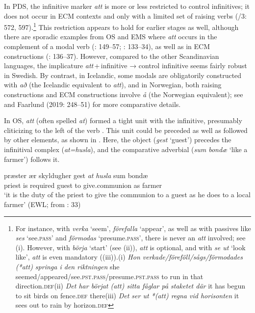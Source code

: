 \documentclass[output=paper]{langscibook}
\begin{document}
In PDS, the infinitive marker \textit{att} is more or less restricted to control infinitives; it does not occur in ECM contexts and only with a limited set of raising verbs (\citealt{TelemanEtAl1999}/3: 572, 597).\footnote{For instance, with \textit{verka} ‘seem’, \textit{förefalla} ‘appear’, as well as with passives like \textit{ses} ‘see.\textsc{pass}’ and \textit{förmodas} ‘presume.\textsc{pass}’, there is never an \textit{att} involved; see (i). However, with \textit{börja} ‘start’ (see (ii)), \textit{att} is optional, and with \textit{se ut} ‘look like’, \textit{att} is even mandatory ((iii)).(i)  \textit{Hon   verkade/föreföll/sågs/förmodades     (*att)   springa   i    den   riktningen}  she   seemed/appeared/see\textsc{.pst.pass}/presume\textsc{.pst.pass} to     run     in   that   direction\textsc{.def}(ii)  \textit{Det   har börjat (att)   sitta   fåglar   på staketet     där}  it   has begun to   sit     birds   on fence\textsc{.def}   there(iii)  \textit{Det   ser     ut   *(att)   regna   vid   horisonten}  it   sees     out to     rain     by   horizon.\textsc{def}} This restriction appears to hold for earlier stages as well, although there are sporadic examples from OS and EMS where \textit{att} occurs in the complement of a modal verb (\citealt{Lagervall2014}: 149–57; \citealt{Kalm2016Satsekvivalenta}: 133–34), as well as in ECM constructions (\citealt{Kalm2016Satsekvivalenta}: 136–37). However, compared to the other Scandinavian languages, the implicature \textit{att}\,+\,infinitive → control infinitive seems fairly robust in Swedish. By contrast, in Icelandic, some modals are obligatorily constructed with \textit{að} (the Icelandic equivalent to \textit{att}), and in Norwegian, both raising constructions and ECM constructions involve \textit{å} (the Norwegian equivalent); see \citet[45]{Kalm2016Satsekvivalenta} and Faarlund (2019: 248–51) for more comparative details.



In OS, \textit{att} (often spelled \textit{at}) formed a tight unit with the infinitive, presumably cliticizing to the left of the verb \citep{Falk2010Studier}. This unit could be preceded as well as followed by other elements, as shown in . Here, the object (\textit{gest} ‘guest’) precedes the infinitival complex (\textit{at=husla}), and the comparative adverbial (\textit{sum bondæ} ‘like a farmer’) follows it.


\ea \label{ex:intro:10}
\gll præster   ær   skyldugher  gest \textit{at} \textit{husla} sum  bondæ \\
  priest  is  required    guest   to  give.communion  as  farmer  \\
\glt ‘it is the duty of the priest to give the communion to a guest as he does to a local farmer’ (EWL; from \citealt{Falk2010Språkhistoria}: 33)
\z
\end{document}
